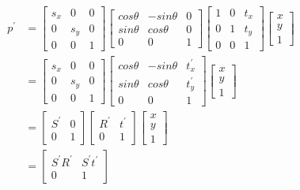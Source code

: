 \documentclass[11pt]{article}
\begin{document}
\begin{equation*}
\begin{split}
    p^{'} & =  
        \begin{bmatrix} s_x &0 &0 \\ 0 &s_y &0 \\ 0 &0 &1 \end{bmatrix} 
        \begin{bmatrix} cos\theta &-sin\theta &0 \\ sin\theta &cos\theta &0 \\ 0 &0 &1 \end{bmatrix} 
        \begin{bmatrix} 1 &0 &t_x \\ 0 &1 &t_y \\ 0 &0 &1 \end{bmatrix}
        \begin{bmatrix} x\\ y\\ 1 \end{bmatrix} 
        \\
        & = \begin{bmatrix} s_x &0 &0 \\ 0 &s_y &0 \\ 0 &0 &1 \end{bmatrix}  
            \begin{bmatrix} cos\theta &-sin\theta &t^{'}_x \\ sin\theta &cos\theta &t^{'}_y \\ 0 &0 &1 \end{bmatrix} 
            \begin{bmatrix} x\\ y\\ 1 \end{bmatrix} 
        \\
        & = \begin{bmatrix} S^{'} &0 \\ 0 &1 \end{bmatrix}
            \begin{bmatrix} R^{'} &t^{'} \\ 0 &1 \end{bmatrix} 
            \begin{bmatrix} x\\ y\\ 1 \end{bmatrix} 
        \\
        & = \begin{bmatrix} S^{'}R^{'} &S^{'}t^{'} \\ 0 &1 \end{bmatrix}

\end{split}
\end{equation*}
\end{document}

